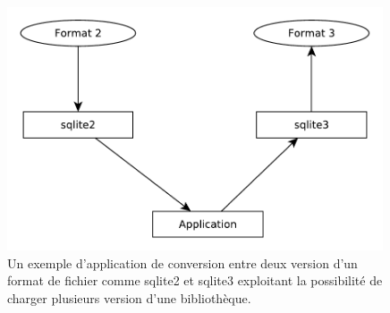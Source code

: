 \begin{figure}[ht]
  \includegraphics[width=30em]{figures/app_convert_v1_to_v2.pdf}
  \caption{Un exemple d'application de conversion entre deux version d'un format
  de fichier comme sqlite2 et sqlite3 exploitant la possibilité de charger plusieurs
  version d'une bibliothèque.}
\end{figure}



